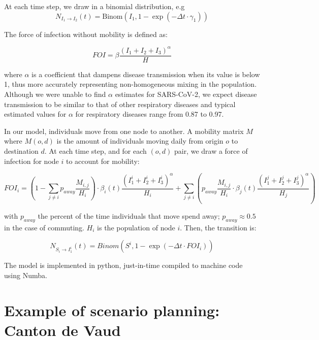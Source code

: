 At each time step, we draw in a binomial distribution, e.g 
\begin{equation}
N_{I_1\longrightarrow I_2}(t) = \text{Binom}(I_1, 1 - \exp(-\Delta t \cdot \gamma_1))
\end{equation}

The force of infection without mobility is defined as: 

\begin{equation}
FOI = \beta \frac{(I_1 + I_2 + I_3)^\alpha}{H} 
\end{equation}

where $\alpha$ is a coefficient that dampens disease transmission when its value is below 1, thus more accurately representing non-homogeneous mixing in the population. Although we were unable to find $\alpha$ estimates for SARS-CoV-2, we expect disease transmission to be similar to that of other respiratory diseases and typical estimated values for $\alpha$ for respiratory diseases range from 0.87 to 0.97.

In our model, individuals move from one node to another. A mobility matrix $M$ where
$M(o,d)$ is the amount of individuals moving daily from origin $o$ to
destination $d$. At each time step, and for each $(o,d)$ pair, we draw a force of infection 
for node $i$ to account for mobility:

\begin{equation}
FOI_i = \left(1 - \sum_{j\neq i} p_{away} \frac{M_{i,j}}{H_i} \right) \cdot \beta_i(t) \frac{(I_1^{i} + I_2^{i} + I_3^{i})^\alpha}{H_i} +  \sum_{j \neq i} \left(p_{away} \frac{M_{i,j}}{H_i} \cdot \beta_j(t) \frac{(I_1^j + I_2^j + I_3^j)^\alpha}{H_j} \right)
\end{equation}

with $p_{away}$ the percent of the time individuals that move spend away; $p_{away} \approx 0.5$ in the case of commuting. $H_i$ is the population of node $i$. Then, the transition is:

\begin{equation}
N_{S_i \longrightarrow I_1^{i}}(t) = Binom(S^i, 1 - \exp(-\Delta t \cdot FOI_i))
\end{equation}

The model is implemented in python, just-in-time compiled to machine code using Numba.

\section{Example of scenario planning: Canton de Vaud}





